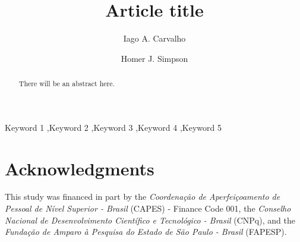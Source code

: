 \documentclass[preprint,review,12pt]{elsarticle}
\begin{document}
\begin{frontmatter}


\title{Article title}


\author[unicamp]{Iago A. Carvalho}

\author[label2]{Homer J. Simpson}

\address[unicamp]{Institute of Computing, Universidade Estadual de Campinas}


\address[label2]{Twenty Century Fox, USA}

\begin{abstract}
There will be an abstract here.
\end{abstract}

\begin{keyword}
Keyword 1 \sep Keyword 2 \sep Keyword 3 \sep Keyword 4 \sep Keyword 5
\end{keyword}

\end{frontmatter}





\section*{Acknowledgments}
This study was financed in part by the \emph{Coordenação de Aperfeiçoamento de Pessoal de Nível Superior - Brasil} (CAPES) - Finance Code 001, the \emph{Conselho Nacional de Desenvolvimento Científico e Tecnológico - Brasil} (CNPq), and the \emph{Fundação de Amparo à Pesquisa do Estado de São Paulo - Brasil} (FAPESP).


% 
% 
% 
% 
% 
% 
% 
% 
% 
% 
% 
% 


\end{document}
